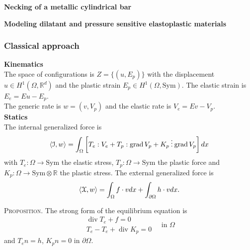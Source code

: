 \documentclass[8pt]{beamer}
\numberwithin{equation}{section}
\theoremstyle{definition}
\DeclareMathOperator{\diver}{div}
\DeclareMathOperator{\grad}{grad}
\DeclarePairedDelimiter{\dual}{\langle}{\rangle}
\newcommand{\threedots}{\mathbin{\vdots}}
\begin{document}
\begin{frame}
\centering
\large\textbf{Necking of a metallic cylindrical bar}
\end{frame}

\begin{frame}
\centering
\large\textbf{Modeling dilatant and pressure sensitive elastoplastic materials}
\end{frame}

\begin{frame}
\frametitle{Classical approach}
\centering
\begin{minipage}[c]{0.6\textwidth}
\textbf{Kinematics}
\\[0.5em]
The space of configurations is $Z=\{(u,E_p)\}$ with the displacement $u\in H^1(\Omega,\mathbb{R}^d)$ and the plastic strain $E_p\in H^1(\Omega,\text{Sym})$. The elastic strain is $E_e=Eu-E_p$.
\\[0.5em]
The generic rate is $w=(v,V_p)$ and the elastic rate is $V_e=Ev-V_p$.
\\[1em]
\textbf{Statics}
\\[0.5ex]
The internal generalized force is
\[
\dual{\mathcal{I},w}=\int_\Omega\left[T_e:V_e+T_p:\grad V_p+K_p\threedots\grad V_p\right]dx
\]
with $T_e\colon\Omega\to\text{Sym}$ the elastic stress, $T_p\colon\Omega\to\text{Sym}$ the plastic force and $K_p\colon\Omega\to\text{Sym}\otimes\mathbb{R}$ the plastic stress. The external generalized force is
\[
\dual{\mathcal{X},w}=\int_\Omega f\cdot vdx+\int_{\partial\Omega}h\cdot vdx.
\]
\end{minipage}
\hspace{0.05\textwidth}
\begin{minipage}[c]{0.33\textwidth}
\begin{center}
\end{center}
\vspace{2em}
\textsc{Proposition.} The strong form of the equilibrium equation is
\[
\begin{gathered}
\diver T_e+f=0\\
T_e-T_e+\diver K_p=0
\end{gathered}
\quad\text{in $\Omega$}
\]
and $T_en=h$, $K_pn=0$ in $\partial\Omega$.
\end{minipage}
\end{frame}
\end{document}
